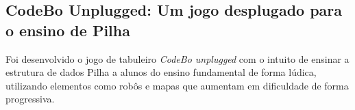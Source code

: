 \subsection{CodeBo Unplugged: Um jogo desplugado para o ensino de Pilha}

Foi desenvolvido o jogo de tabuleiro \textit{CodeBo unplugged} com o intuito de ensinar a estrutura de dados Pilha a alunos do ensino fundamental de forma lúdica, utilizando elementos como robôs e mapas que aumentam em dificuldade de forma progressiva. \cite{de2023codebo}




